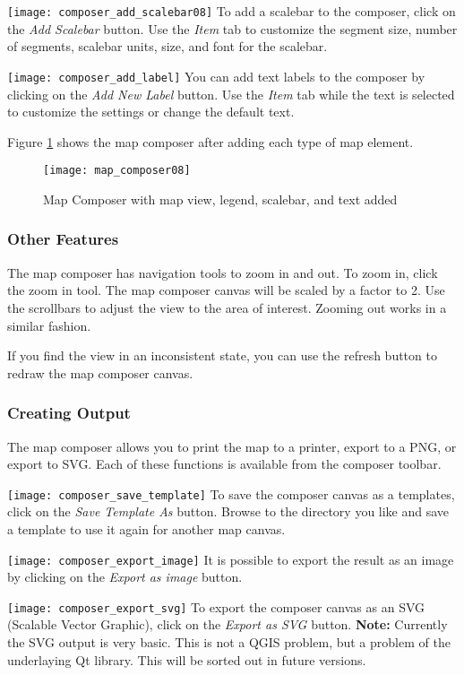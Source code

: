 \texttt{[image: composer\_add\_scalebar08]} To
add a scalebar to the composer, click on the \textit{Add Scalebar} button. Use
the \textit{Item} tab to customize the segment size, number of segments,
scalebar units, size, and font for the scalebar.

\texttt{[image: composer\_add\_label]} You can
add text labels to the composer by clicking on the \textit{Add New Label}
button. Use the \textit{Item} tab while the text is selected to customize the
settings or change the default text.

Figure \ref{fig:map_composer_complete} shows the map composer after adding
each type of map element.
\begin{figure}[h]
   \begin{center}
   \caption{Map Composer with map view, legend, scalebar, and text added}\label{fig:map_composer_complete}\smallskip
   \texttt{[image: map\_composer08]}
\end{center}  
\end{figure}

\subsubsection{Other Features}

The map composer has navigation tools to zoom in and out. To zoom in, click
the zoom in tool. The map composer canvas will be scaled by a factor to 2. Use
the scrollbars to adjust the view to the area of interest. Zooming out works
in a similar fashion.

If you find the view in an inconsistent state, you can use the refresh button
to redraw the map composer canvas.

\subsubsection{Creating Output}

The map composer allows you to print the map to a printer, export to a PNG, or
export to SVG. Each of these functions is available from the composer toolbar.

\texttt{[image: composer\_save\_template]} To save the composer canvas 
as a templates, click on the \textit{Save Template As} button. Browse to the directory 
you like and save a template to use it again for another map canvas.

\texttt{[image: composer\_export\_image]} It is possible to export the result 
as an image by clicking on the \textit{Export as image} button. 

\texttt{[image: composer\_export\_svg]} To export the composer canvas as an 
SVG (Scalable Vector Graphic), click on the \textit{Export as SVG} button. 
\textbf{Note:} Currently the SVG output is very basic. This is not a QGIS problem, but a
problem of the underlaying Qt library. This will be sorted out in future versions.
 
